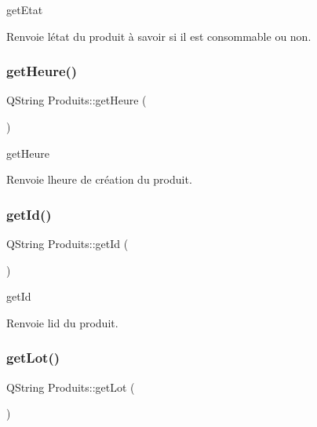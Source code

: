get\+Etat 

\begin{DoxyReturn}{Renvoie}
l\textquotesingle{}état du produit à savoir si il est consommable ou non. 
\end{DoxyReturn}
\mbox{\label{class_produits_af33acfbd18f5066923255b746beff1a6}} 
\subsubsection{\texorpdfstring{get\+Heure()}{getHeure()}}
{\footnotesize\ttfamily Q\+String Produits\+::get\+Heure (\begin{DoxyParamCaption}{ }\end{DoxyParamCaption})}



get\+Heure 

\begin{DoxyReturn}{Renvoie}
l\textquotesingle{}heure de création du produit. 
\end{DoxyReturn}
\mbox{\label{class_produits_a3aee7de9dc5c38b50decec407bbd0754}} 
\subsubsection{\texorpdfstring{get\+Id()}{getId()}}
{\footnotesize\ttfamily Q\+String Produits\+::get\+Id (\begin{DoxyParamCaption}{ }\end{DoxyParamCaption})}



get\+Id 

\begin{DoxyReturn}{Renvoie}
l\textquotesingle{}id du produit. 
\end{DoxyReturn}
\mbox{\label{class_produits_a61d14c4abe4fa116b6a2993feb27bf7f}} 
\subsubsection{\texorpdfstring{get\+Lot()}{getLot()}}
{\footnotesize\ttfamily Q\+String Produits\+::get\+Lot (\begin{DoxyParamCaption}{ }\end{DoxyParamCaption})}



